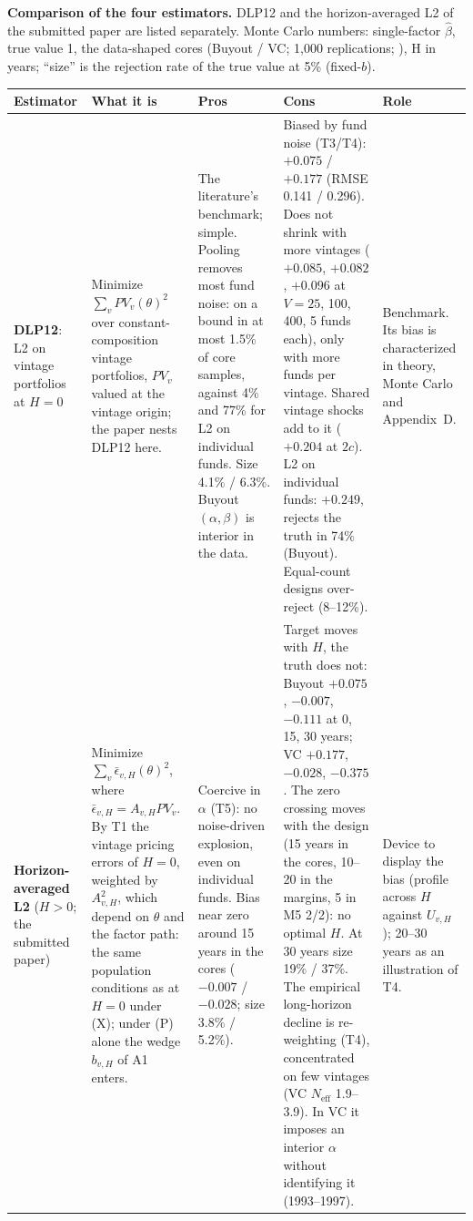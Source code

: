 \documentclass[11pt]{article}
\newcommand{\file}[1]{\path{#1}}
\begin{document}
\textbf{Comparison of the four estimators.} DLP12 and the horizon-averaged L2 of the submitted paper are listed separately. Monte Carlo numbers: single-factor $\hat\beta$, true value 1, the data-shaped cores (Buyout / VC; 1{,}000 replications; \file{results/mc_step4/summary.csv}), H in years; ``size'' is the rejection rate of the true value at 5\% (fixed-$b$).
{\small
\begin{longtable}{@{}L{2.0cm}L{3.0cm}L{4.2cm}L{4.2cm}L{1.9cm}@{}}
\toprule
Estimator & What it is & Pros & Cons & Role\\
\midrule
\endhead
\textbf{DLP12}: L2 on vintage portfolios at $H=0$
& Minimize $\sum_v PV_v(\theta)^2$ over constant-composition vintage portfolios, $PV_v$ valued at the vintage origin; the paper nests DLP12 here.
& The literature's benchmark; simple. Pooling removes most fund noise: on a bound in at most 1.5\% of core samples, against 4\% and 77\% for L2 on individual funds. Size 4.1\% / 6.3\%. Buyout $(\alpha,\beta)$ is interior in the data.
& Biased by fund noise (T3/T4): $+0.075$ / $+0.177$ (RMSE 0.141 / 0.296). Does not shrink with more vintages ($+0.085$, $+0.082$, $+0.096$ at $V=25$, 100, 400, 5 funds each), only with more funds per vintage. Shared vintage shocks add to it ($+0.204$ at $2c$). L2 on individual funds: $+0.249$, rejects the truth in 74\% (Buyout). Equal-count designs over-reject (8--12\%).
& Benchmark. Its bias is characterized in theory, Monte Carlo and Appendix~D.\\
\addlinespace
\textbf{Horizon-averaged L2} ($H>0$; the submitted paper)
& Minimize $\sum_v\bar\epsilon_{v,H}(\theta)^2$, where $\bar\epsilon_{v,H}=A_{v,H}PV_v$. By T1 the vintage pricing errors of $H=0$, weighted by $A_{v,H}^2$, which depend on $\theta$ and the factor path: the same population conditions as at $H=0$ under (X); under (P) alone the wedge $b_{v,H}$ of A1 enters.
& Coercive in $\alpha$ (T5): no noise-driven explosion, even on individual funds. Bias near zero around 15 years in the cores ($-0.007$ / $-0.028$; size 3.8\% / 5.2\%).
& Target moves with $H$, the truth does not: Buyout $+0.075$, $-0.007$, $-0.111$ at 0, 15, 30 years; VC $+0.177$, $-0.028$, $-0.375$. The zero crossing moves with the design (15 years in the cores, 10--20 in the margins, 5 in M5 2/2): no optimal $H$. At 30 years size 19\% / 37\%. The empirical long-horizon decline is re-weighting (T4), concentrated on few vintages (VC $N_{\mathrm{eff}}$ 1.9--3.9). In VC it imposes an interior $\alpha$ without identifying it (1993--1997).
& Device to display the bias (profile across $H$ against $U_{v,H}$); 20--30 years as an illustration of T4.\\

\end{longtable}}
\end{document}
